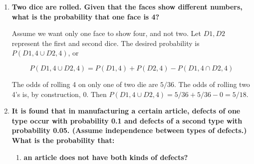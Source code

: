 \documentclass[10pt, oneside]{article}
\begin{document}
\begin{enumerate}[label=3.\arabic*]
The desired probability is $P(H_0 \cup H_1 \cup H_2 \cup H_3)$, where $H_i$ is both roll $i$ number of heads, $0 \leq i \leq 3$. Notably, these are mutually exclusive events, so we can calculate this as

\[ P(H_1 \cup H_2 \cup H_3) = \sum P(H_i) \]

In \textit{one} person flipping three coins, there is a 3/8 chance of exactly one of the three flipping heads. Same for flipping exactly two heads. For flipping three and no heads, the chances are 1/8. Since each person flips their coins independent of the other, we have $P(H_0) = 1/8 \cdot 1/8 = 1/64$, $P(H_1) = 3/8 \cdot 3/8 = 9/64$, $P(H_2) = 3/8 \cdot 3/8 = 9/64$, and $P(H_3) = 1/8 \cdot 1/8 = 1/64$. Summing yields:

\[ P(H_1 \cup H_2 \cup H_3) = \sum P(H_i) = \boxed{5/16} \]

\item  \begin{tcolorbox}[
  colback=Cerulean!5!white,
  colframe=Cerulean!75!black]
\textbf{Two dice are rolled. Given that the faces show different numbers, what is the probability that one face is 4?}
\end{tcolorbox}

Assume we want only one face to show four, and not two. Let $D1, D2$ represent the first and second dice. The desired probability is $P(D1, 4 \cup D2, 4)$, or

\[ P(D1, 4 \cup D2, 4) = P(D1, 4) + P(D2, 4) - P(D1,4 \cap D2,4) \]

The odds of rolling 4 on only one of two die are $5/36$. The odds of rolling two 4's is, by construction, $0$. Then $P(D1, 4 \cup D2, 4) = 5/36 + 5/36 - 0 = \boxed{5/18}$.

\item  \begin{tcolorbox}[
  colback=Cerulean!5!white,
  colframe=Cerulean!75!black]
\textbf{It is found that in manufacturing a certain article, defects of one type occur with probability 0.1 and defects of a second type with probability 0.05. (Assume independence between types of defects.) What is the probability that:}
\end{tcolorbox}

	\begin{enumerate}
	\item  \begin{tcolorbox}[
	  colback=Cerulean!5!white,
	  colframe=Cerulean!75!black]
	\textbf{an article does not have both kinds of defects?}
	\end{tcolorbox}
	

\end{enumerate}
\end{enumerate}
\end{document}
